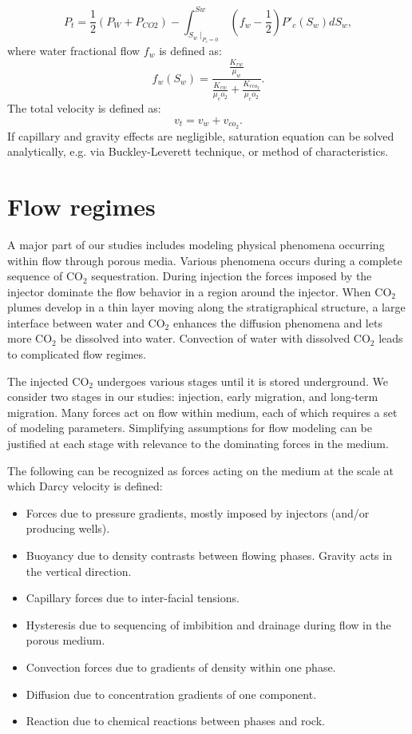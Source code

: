 \begin{equation}
 P_t=\frac{1}{2} (P_W+P_{CO2})-\int^{Sw}_{S_w
\mid_{P_c=0}}(f_w-\frac{1}{2}){P'}_c(S_w)dS_w,
 \label{eq:GP}
\end{equation} where water fractional flow $f_w$ is defined as:
\begin{equation}
 f_w(S_w)=\frac{\frac{K_{rw}}{\mu_w}}{\frac{K_{rw}}{\mu_co_2}+\frac{K_{rco_2}}{
\mu_co_2}}.
 \label{eq:fw}
\end{equation} The total velocity is defined as:
\begin{equation}
 v_t=v_w+v_{co_2}.
 \label{eq:VT}
\end{equation}If capillary and gravity effects are negligible, saturation
equation can be solved analytically, e.g. via Buckley-Leverett technique, or
method of characteristics.


\section{Flow regimes}
\label{sec:FlowRegimes}

A major part of our studies includes modeling physical phenomena occurring
within
flow through porous media. Various phenomena occurs during a complete sequence
of $\mbox{CO}_2$ sequestration. During injection the forces imposed by the injector
dominate the flow behavior in a region around the injector. When $\mbox{CO}_2$
plumes develop in a thin layer moving along the stratigraphical structure, a
large interface between water and $\mbox{CO}_2$ enhances the diffusion phenomena
and lets more $\mbox{CO}_2$ be dissolved into water. Convection of water with
dissolved $\mbox{CO}_2$ leads to complicated flow regimes.

The injected $\mbox{CO}_2$ undergoes various stages until it is stored
underground. We consider two stages in our studies: injection, early
migration, and long-term migration. Many forces act on flow within medium, each
of which requires a set of modeling parameters. Simplifying assumptions for flow
modeling can be justified at each stage with relevance to the dominating forces in
the medium.

The following can be recognized as forces acting on the medium at the scale at
which Darcy velocity is defined:

\begin{itemize}
\item Forces due to pressure gradients, mostly imposed by injectors (and/or
producing wells).
\item Buoyancy due to density contrasts between flowing phases. Gravity acts in the vertical direction.
\item Capillary forces due to inter-facial tensions.
\item Hysteresis due to sequencing of imbibition and drainage during flow in
the porous medium.
\item Convection forces due to gradients of density within one phase.
\item Diffusion due to concentration gradients of one component.
\item Reaction due to chemical reactions between phases and rock.
\end{itemize}

